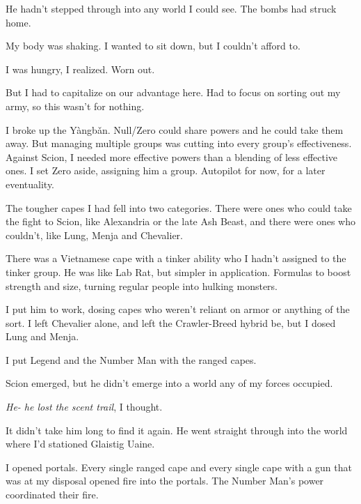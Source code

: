 He hadn't stepped through into any world I could see.  The bombs had struck home.



My body was shaking.  I wanted to sit down, but I couldn't afford to.



I was hungry, I realized.  Worn out.



But I had to capitalize on our advantage here.  Had to focus on sorting out my army, so this wasn't for nothing.



I broke up the Y\`{a}ngb\v{a}n.  Null/Zero could share powers and he could take them away.  But managing multiple groups was cutting into every group's effectiveness.  Against Scion, I needed more effective powers than a blending of less effective ones.  I set Zero aside, assigning him a group.  Autopilot for now, for a later eventuality.



The tougher capes I had fell into two categories.  There were ones who could take the fight to Scion, like Alexandria or the late Ash Beast, and there were ones who couldn't, like Lung, Menja and Chevalier.



There was a Vietnamese cape with a tinker ability who I hadn't assigned to the tinker group.  He was like Lab Rat, but simpler in application.  Formulas to boost strength and size, turning regular people into hulking monsters.



I put him to work, dosing capes who weren't reliant on armor or anything of the sort.  I left Chevalier alone, and left the Crawler-Breed hybrid be, but I dosed Lung and Menja.



I put Legend and the Number Man with the ranged capes.



Scion emerged, but he didn't emerge into a world any of my forces occupied.



\emph{He- he lost the scent trail}, I thought.



It didn't take him long to find it again.  He went straight through into the world where I'd stationed Glaistig Uaine.



I opened portals.  Every single ranged cape and every single cape with a gun that was at my disposal opened fire into the portals.  The Number Man's power coordinated their fire.



